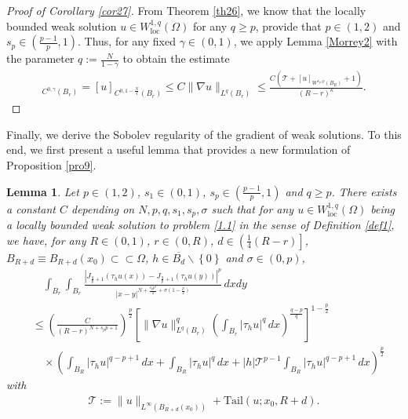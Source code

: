 \documentclass[reqno,10pt]{amsart}
\numberwithin{equation}{section}
\newtheorem{lemma}[theorem]{Lemma}
\begin{document}
\begin{proof}[Proof of Corollary \ref{cor27}]
	From Theorem \ref{th26}, we know that the locally bounded weak solution $u\in W^{1,q}_\mathrm{loc}(\Omega)$ for any $q\ge p$, provide that $p\in (1,2)$ and $s_p\in\left( \frac{p-1}{p},1\right) $. Thus, for any fixed $\gamma\in(0,1)$, we apply Lemma \ref{Morrey2} with the parameter $q:=\frac{N}{1-\gamma}$ to obtain the estimate
	\begin{align*}
		[u]_{C^{0,\gamma}(B_r)}= [u]_{C^{0,1-\frac{N}{q}}(B_r)}\le C\|\nabla u\|_{L^q(B_r)}\le \frac{C\left( \mathcal{T}+[u]_{W^{s_p,p}(B_R)}+1\right) }{(R-r)^{\kappa}}.
	\end{align*}
\end{proof}

Finally, we derive the Sobolev regularity of the gradient of weak solutions.
To this end, we first present a useful lemma that provides a new formulation of Proposition \ref{pro9}.
\begin{lemma}
	\label{lem20}
		Let $p\in(1,2)$, $s_1\in(0,1)$, $s_p\in \left( \frac{p-1}{p},1\right) $ and $q\ge p$. There exists a constant $C$ depending on $N,p,q,s_1,s_p,\sigma$ such that for any $u\in W^{1,q}_{\mathrm{loc}}(\Omega)$ being a locally bounded weak solution to problem \eqref{1.1} in the sense of Definition \ref{def1}, we have, for any $R\in(0,1)$, $r\in(0,R)$, $d\in\left(\frac{1}{4}(R-r) \right] $, $B_{R+d}\equiv B_{R+d}(x_0)\subset\subset\Omega$, $h\in \overline{B_d}\backslash\left\lbrace 0\right\rbrace $ and $\sigma\in(0,p)$,
	\begin{align*}
		&\quad\int_{B_r}\int_{B_r}\frac{\left| J_{\frac{q}{p}+1}\left( \tau_hu(x)\right)-J_{\frac{q}{p}+1}\left( \tau_hu(y)\right) \right|^p }{|x-y|^{N+\frac{s_pp^2}{2}+\sigma\left( 1-\frac{p}{2}\right) }}\,dxdy\\
		&\le \left( \frac{C}{(R-r)^{N+s_pp+1}}\right)^\frac{p}{2}\left[ \|\nabla u\|^q_{L^q(B_r)}\left( \int_{B_r}|\tau_hu|^q\,dx\right)^\frac{q-p}{q} \right]^{1-\frac{p}{2}}\\
		&\quad\times\left(\int_{B_R}|\tau_hu|^{q-p+1}\,dx+\int_{B_R}|\tau_hu|^q\,dx+|h|\mathcal{T}^{p-1}\int_{B_R}|\tau_hu|^{q-p+1}\,dx\right) ^\frac{p}{2}
	\end{align*}
	with
	\begin{align*}
		\mathcal{T}:=\|u\|_{L^\infty(B_{R+d}(x_0))}+\mathrm{Tail}(u;x_0,R+d).
	\end{align*}
\end{lemma}
\end{document}
